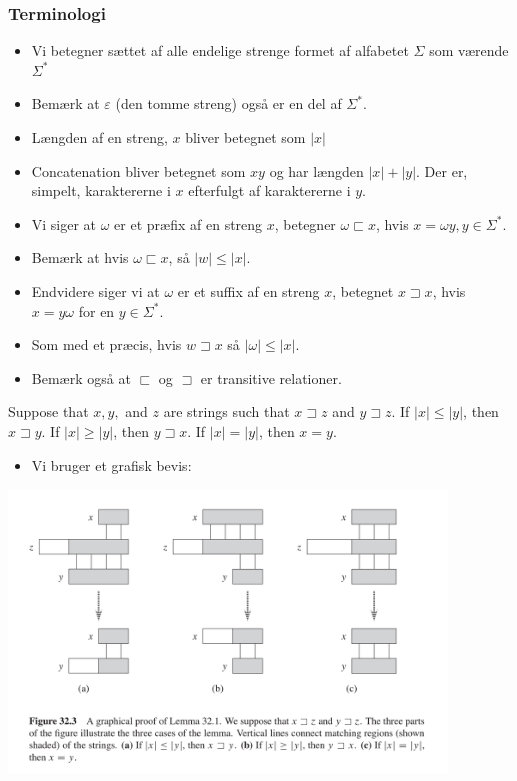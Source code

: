 \documentclass{beamer}
\begin{document}
\begin{frame}[allowframebreaks]
  \frametitle{Terminologi}
 \begin{itemize}
 \item Vi betegner sættet af alle endelige strenge formet af alfabetet $\Sigma$ som værende $\Sigma^*$
 \item Bemærk at $\varepsilon$ (den tomme streng) også er en del af $\Sigma^{*}$.
 \item Længden af en streng, $x$ bliver betegnet som $|x|$
 \item Concatenation bliver betegnet som $xy$ og har længden $|x| + |y|$. Der er, simpelt, karaktererne i $x$ efterfulgt af karaktererne i $y$.
   \item Vi siger at $\omega$ er et præfix af en streng $x$, betegner $\omega \sqsubset x$, hvis $x = \omega y, y \in \Sigma^{*}$. 
   \item Bemærk at hvis $\omega \sqsubset x$, så $|w| \leq |x|$. 
   \item Endvidere siger vi at $\omega$ er et suffix af en streng $x$, betegnet $x \sqsupset x$, hvis $x = y \omega$ for en $y \in \Sigma^{*}$. 
   \item Som med et præcis, hvis $w \sqsupset x$ så $|\omega| \leq |x|$.
   \item Bemærk også at $\sqsubset $ og $\sqsupset$ er transitive relationer. 
 \end{itemize} 
 \begin{lemma}
Suppose that $x, y, $ and $z$ are strings such that $x \sqsupset z$ and $y \sqsupset z$. If $|x| \leq |y|$, then $x \sqsupset y$. If $|x| \geq |y|$, then $y \sqsupset x$. If $|x| = |y|$, then $x = y$.
\end{lemma}
\begin{itemize}
\item Vi bruger et grafisk bevis:
\end{itemize}
\vspace{1cm}
\includegraphics[width=330pt]{main--string-matching-c1c3.png}
\vspace{1cm}

\end{frame}
\end{document}
